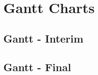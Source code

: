 \chapter{Gantt Charts}
\newpage
\section{Gantt - Interim} \label{gc-interim}
\begin{center}
\end{center}

\section{Gantt - Final} \label{gc-final}
\begin{center}
\end{center}